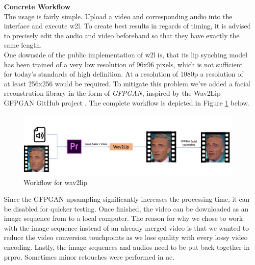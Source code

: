 \documentclass[
  a4paper,  %
  twoside,  %
  bibliography=totoc,
  headsepline,
  cleardoublepage=empty,
  parskip=half,
  draft=false
]{scrbook}
\begin{document}
\textbf{Concrete Workflow} \\
The usage is fairly simple. Upload a video and corresponding audio into the interface and execute \gls{w2l}. To create best results in regards of timing, it is advised to precisely edit the audio and video beforehand so that they have exactly the same length. \\
One downside of the public implementation of \gls{w2l} is, that its lip synching model has been trained of a very low resolution of 96x96 pixels, which is not sufficient for today's standards of high definition. At a resolution of 1080p a resolution of at least 256x256 would be required. To mitigate this problem we've added a facial reconstrution library in the form of \textit{GFPGAN}, inspired by the Wav2Lip-GFPGAN GitHub project \cite{sainyAjaysainyWav2LipGFPGAN2023}.
The complete workflow is depicted in Figure \ref{fig:w2l workflow} below.
\begin{figure}[h]
  \centering
  \includegraphics[width=1\textwidth]{./graphics/images/wav2lip/w2l workflow.png}
  \caption{Workflow for wav2lip}
  \label{fig:w2l workflow}
\end{figure}
Since the GFPGAN upsampling significantly increases the processing time, it can be disabled for quicker testing. Once finished, the video can be downloaded as an image sequence from to a local computer. The reason for why we chose to work with the image sequence instead of an already merged video is that we wanted to reduce the video conversion touchpoints as we lose quality with every lossy video encoding. Lastly, the image sequences and audios need to be put back together in \gls{prpro}. Sometimes minor retouches were performed in \gls{ae}.
\end{document}
